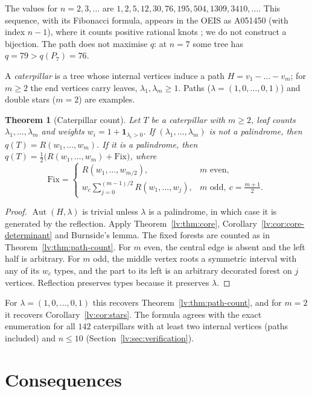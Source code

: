 \documentclass[11pt,a4paper]{article}
\newtheorem{theorem}{Theorem}[section]
\theoremstyle{definition}
\theoremstyle{remark}
\newcommand{\Aut}{\operatorname{Aut}}
\begin{document}
The values for $n=2,3,\dots$ are $1,2,5,12,30,76,195,504,1309,3410,\dots$. This sequence, with its Fibonacci formula, appears in the OEIS as A051450 (with index $n-1$), where it counts positive rational knots \cite{lv:OEIS}; we do not construct a bijection. The path does not maximise $q$: at $n=7$ some tree has $q=79>q(P_7)=76$.

A \emph{caterpillar} is a tree whose internal vertices induce a path $H=v_1-\dots-v_m$; for $m\geq2$ the end vertices carry leaves, $\lambda_1,\lambda_m\geq1$. Paths ($\lambda=(1,0,\dots,0,1)$) and double stars ($m=2$) are examples.

\begin{theorem}[Caterpillar count]
\label{lv:thm:caterpillar}
Let $T$ be a caterpillar with $m\geq2$, leaf counts $\lambda_1,\dots,\lambda_m$ and weights $w_i=1+\mathbf 1_{\lambda_i>0}$. If $(\lambda_1,\dots,\lambda_m)$ is not a palindrome, then $q(T)=R(w_1,\dots,w_m)$. If it is a palindrome, then $q(T)=\tfrac12\bigl(R(w_1,\dots,w_m)+\mathrm{Fix}\bigr)$, where
\[
 \mathrm{Fix}=
 \begin{cases}
 R(w_1,\dots,w_{m/2}), & m\text{ even},\\[2pt]
 w_c\sum_{j=0}^{(m-1)/2}R(w_1,\dots,w_j), & m\text{ odd},\ c=\tfrac{m+1}2.
 \end{cases}
\]
\end{theorem}

\begin{proof}
$\Aut(H,\lambda)$ is trivial unless $\lambda$ is a palindrome, in which case it is generated by the reflection. Apply Theorem~\ref{lv:thm:core}, Corollary~\ref{lv:cor:core-determinant} and Burnside's lemma. The fixed forests are counted as in Theorem~\ref{lv:thm:path-count}. For $m$ even, the central edge is absent and the left half is arbitrary. For $m$ odd, the middle vertex roots a symmetric interval with any of its $w_c$ types, and the part to its left is an arbitrary decorated forest on $j$ vertices. Reflection preserves types because it preserves $\lambda$.
\end{proof}

For $\lambda=(1,0,\dots,0,1)$ this recovers Theorem~\ref{lv:thm:path-count}, and for $m=2$ it recovers Corollary~\ref{lv:cor:stars}. The formula agrees with the exact enumeration for all $142$ caterpillars with at least two internal vertices (paths included) and $n\leq10$ (Section~\ref{lv:sec:verification}).

\section{Consequences}
\label{lv:sec:consequences}
\end{document}
